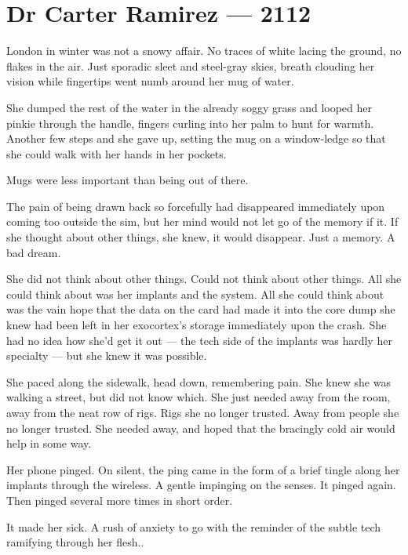 \hypertarget{dr-carter-ramirez-2112}{%
\chapter*{Dr Carter Ramirez — 2112}\label{dr-carter-ramirez-2112}}

London in winter was not a snowy affair. No traces of white lacing the ground, no flakes in the air. Just sporadic sleet and steel-gray skies, breath clouding her vision while fingertips went numb around her mug of water.

She dumped the rest of the water in the already soggy grass and looped her pinkie through the handle, fingers curling into her palm to hunt for warmth. Another few steps and she gave up, setting the mug on a window-ledge so that she could walk with her hands in her pockets.

Mugs were less important than being out of there.

The pain of being drawn back so forcefully had disappeared immediately upon coming too outside the sim, but her mind would not let go of the memory if it. If she thought about other things, she knew, it would disappear. Just a memory. A bad dream.

She did not think about other things. Could not think about other things. All she could think about was her implants and the system. All she could think about was the vain hope that the data on the card had made it into the core dump she knew had been left in her exocortex's storage immediately upon the crash. She had no idea how she'd get it out — the tech side of the implants was hardly her specialty — but she knew it was possible.

She paced along the sidewalk, head down, remembering pain. She knew she was walking a street, but did not know which. She just needed away from the room, away from the neat row of rigs. Rigs she no longer trusted. Away from people she no longer trusted. She needed away, and hoped that the bracingly cold air would help in some way.

Her phone pinged. On silent, the ping came in the form of a brief tingle along her implants through the wireless. A gentle impinging on the senses. It pinged again. Then pinged several more times in short order.

It made her sick. A rush of anxiety to go with the reminder of the subtle tech ramifying through her flesh..

